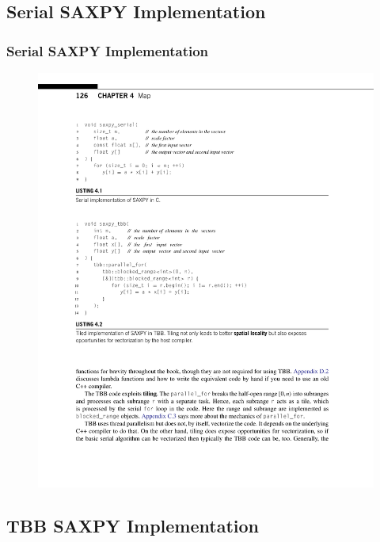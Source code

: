 \documentclass[xcolor=dvipsnames]{beamer}
\begin{document}
	\subsection{Serial SAXPY Implementation}
	
		\begin{frame} \frametitle{Serial SAXPY Implementation}
			\begin{figure}
				\centering
				\includegraphics[width=115mm]{images/listing-4-1.pdf}
			\end{figure}
		\end{frame}
		
	\subsection{TBB SAXPY Implementation}
	
\end{document}
